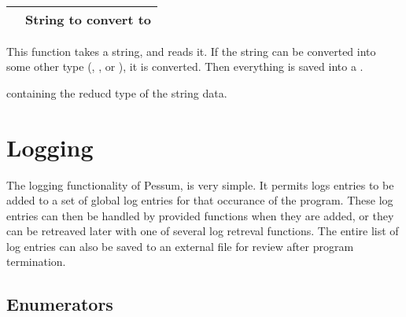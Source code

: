 \documentclass[letterpaper,10pt,english]{sphinxmanual}
\begin{document}
\begin{fulllineitems}
\label{\detokenize{datapoint:_CPPv2N6pessum14Make_DataPointENSt6stringE}}%
\pysigstartmultiline
{}%
\pysigstopmultiline~

\begin{savenotes}\sphinxattablestart
\centering
\begin{tabulary}{\linewidth}[t]{|T|T|}
\hline

&
String to convert to {\hyperref[\detokenize{datapoint:_CPPv2N6pessum9DataPointE}]{}}
\\
\hline
\end{tabulary}
\par
\sphinxattableend\end{savenotes}

This function takes a string, and reads it. If the string can be converted
into some other type (, , or ), it is converted.
Then everything is saved into a {\hyperref[\detokenize{datapoint:_CPPv2N6pessum9DataPointE}]{}}.

 {\hyperref[\detokenize{datapoint:_CPPv2N6pessum9DataPointE}]{}} containing the reducd type of the string data.

\end{fulllineitems}



\chapter{Logging}
\label{\detokenize{log:logging}}\label{\detokenize{log::doc}}
The logging functionality of Pessum, is very simple. It permits logs entries to
be added to a set of global log entries for that occurance of the program. These
log entries can then be handled by provided functions when they are added, or
they can be retreaved later with one of several log retreval functions. The
entire list of log entries can also be saved to an external file for review
after program termination.


\section{Enumerators}
\label{\detokenize{log:enumerators}}
\end{document}

